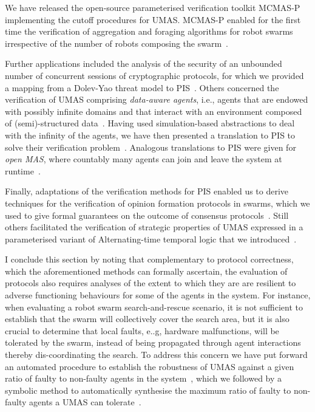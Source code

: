 \documentclass{article}
\newcommand{\mcmasp}{\textsc{MCMAS-P}\xspace}
\begin{document}
We have released the open-source parameterised verification toolkit \mcmasp
implementing the cutoff procedures for UMAS.  \mcmasp enabled for the first time
the verification of aggregation and foraging algorithms for robot swarms
irrespective of the number of robots composing the
swarm~\cite{KouvarosLomuscio15b,KouvarosLomuscio16a}.  

Further applications included the analysis of the security of an unbounded
number of concurrent sessions of cryptographic protocols, for which we provided
a mapping from a Dolev-Yao threat model to
PIS~\cite{BoureanuKouvarosLomuscio16}.   
Others concerned  the verification of UMAS comprising {\em data-aware agents},
i.e., agents that are endowed with possibly infinite domains and that interact
with an environment composed of (semi)-structured
data~\cite{MontaliCalvaneseGiacomo14}.  Having used simulation-based
abstractions to deal with the infinity of the  agents, we have then presented  a
translation  to PIS to solve their verification
problem~\cite{BelardinelliKouvarosLomuscio17}. Analogous translations to PIS were 
 given for {\em open MAS},  where countably many agents can join and
leave the system at runtime~\cite{Kouvaros+19}.


Finally,  adaptations of the verification methods for PIS  enabled us to derive
techniques for the verification of opinion formation protocols in swarms, which
we used to give formal guarantees on the outcome of consensus
protocols~\cite{KouvarosLomuscio16b}. Still others facilitated the
verification of strategic properties of UMAS expressed in a parameterised
variant  of Alternating-time temporal logic that we
introduced~\cite{KouvarosLomuscio16c}.

I conclude this section by noting that complementary to protocol correctness,
which the aforementioned  methods can formally ascertain, the evaluation
of protocols also requires   analyses of the extent to which they are are
resilient to adverse functioning behaviours for some of the agents in the
system.  For instance, when evaluating a robot swarm search-and-rescue scenario,
it is not sufficient to establish that the swarm will collectively cover the
search area, but it is also crucial to determine that local faults, e..g,
hardware malfunctions, will be tolerated by the swarm, instead of being
propagated through agent interactions thereby dis-coordinating the search. To
address this concern we have put forward an automated procedure to establish the
robustness of UMAS against a given ratio of faulty to non-faulty agents in the
system~\cite{KouvarosLomuscio17b}, which we followed by a symbolic method to
automatically synthesise the maximum ratio of faulty to non-faulty agents a UMAS
can tolerate~\cite{KouvarosLomuscioPirovano18}.  
\end{document}

